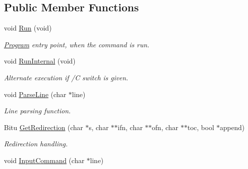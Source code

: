 \subsection*{Public Member Functions}
\begin{DoxyCompactItemize}
\item 
\hypertarget{classDOS__Shell_a37ec1896f94ab70c29368bd09fb71997}{void \hyperlink{classDOS__Shell_a37ec1896f94ab70c29368bd09fb71997}{Run} (void)}\label{classDOS__Shell_a37ec1896f94ab70c29368bd09fb71997}

\begin{DoxyCompactList}\small\item\em \hyperlink{classProgram}{Program} entry point, when the command is run. \end{DoxyCompactList}\item 
\hypertarget{classDOS__Shell_abba5a3bde7767e73ebbd1452de6ba3c0}{void \hyperlink{classDOS__Shell_abba5a3bde7767e73ebbd1452de6ba3c0}{Run\-Internal} (void)}\label{classDOS__Shell_abba5a3bde7767e73ebbd1452de6ba3c0}

\begin{DoxyCompactList}\small\item\em Alternate execution if /\-C switch is given. \end{DoxyCompactList}\item 
\hypertarget{classDOS__Shell_ad4280cf9e2c07d534b7e32f9c58749d3}{void \hyperlink{classDOS__Shell_ad4280cf9e2c07d534b7e32f9c58749d3}{Parse\-Line} (char $\ast$line)}\label{classDOS__Shell_ad4280cf9e2c07d534b7e32f9c58749d3}

\begin{DoxyCompactList}\small\item\em Line parsing function. \end{DoxyCompactList}\item 
\hypertarget{classDOS__Shell_a9d973a166cc62e735edc3a8560913136}{Bitu \hyperlink{classDOS__Shell_a9d973a166cc62e735edc3a8560913136}{Get\-Redirection} (char $\ast$s, char $\ast$$\ast$ifn, char $\ast$$\ast$ofn, char $\ast$$\ast$toc, bool $\ast$append)}\label{classDOS__Shell_a9d973a166cc62e735edc3a8560913136}

\begin{DoxyCompactList}\small\item\em Redirection handling. \end{DoxyCompactList}\item 
\hypertarget{classDOS__Shell_a3e2a3258d53dc6309adc9f1d3c8cde49}{void \hyperlink{classDOS__Shell_a3e2a3258d53dc6309adc9f1d3c8cde49}{Input\-Command} (char $\ast$line)}\label{classDOS__Shell_a3e2a3258d53dc6309adc9f1d3c8cde49}


\end{DoxyCompactItemize}
